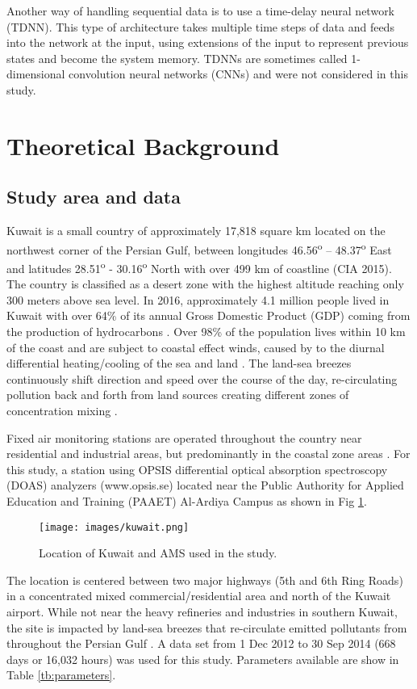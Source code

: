 \documentclass[preprint,12pt,authoryear]{elsarticle}
\begin{document}
\begin{linenumbers}
Another way of handling sequential data is to use a time-delay neural network (TDNN). This type of architecture takes multiple time steps of data and feeds into the network at the input, using extensions of the input to represent previous states and become the system memory. TDNNs are sometimes called 1-dimensional convolution neural networks (CNNs) \citep{Goodfellow2016} and were not considered in this study.

\section{Theoretical Background}

\subsection{Study area and data}
Kuwait is a small country of approximately 17,818 square km located on the northwest corner of the Persian Gulf, between longitudes 46.56\textsuperscript{o} – 48.37\textsuperscript{o} East and latitudes 28.51\textsuperscript{o} - 30.16\textsuperscript{o} North with over 499 km of coastline (CIA 2015).  The country is classified as a desert zone with the highest altitude reaching only 300 meters above sea level. In 2016, approximately 4.1 million people lived in Kuwait \citep{CSB2016} with over 64\% of its annual Gross Domestic Product (GDP) coming from the production of hydrocarbons \citep{KAMCO2013}.  Over 98\% of the population lives within 10 km of the coast and are subject to coastal effect winds, caused by to the diurnal differential heating/cooling of the sea and land \citep{Crosman2010, Cuxart2014}.  The land-sea breezes continuously shift direction and speed over the course of the day, re-circulating pollution back and forth from land sources creating different zones of concentration mixing \citep{Freeman2016}.

Fixed air monitoring stations are operated throughout the country near residential and industrial areas, but predominantly in the coastal zone areas \citep{Freeman2016a}. For this study, a station using OPSIS differential optical absorption spectroscopy (DOAS) analyzers (www.opsis.se) located near the Public Authority for Applied Education and Training (PAAET) Al-Ardiya Campus as shown in Fig \ref{fig:Kuwait}. 
%
\begin{figure}[H]
\centering
\texttt{[image: images/kuwait.png]}  %
\caption{Location of Kuwait and AMS used in the study.}
\label{fig:Kuwait}
\end{figure}
%
The location is centered between two major highways (5th and 6th Ring Roads) in a concentrated mixed commercial/residential area and north of the Kuwait airport. While not near the heavy refineries and industries in southern Kuwait, the site is impacted by land-sea breezes that re-circulate emitted pollutants from throughout the Persian Gulf \citep{Freeman2016}. A data set from 1 Dec 2012 to 30 Sep 2014 (668 days or 16,032 hours) was used for this study. Parameters available are show in Table \ref{tb:parameters}.

\end{linenumbers}
\end{document}
